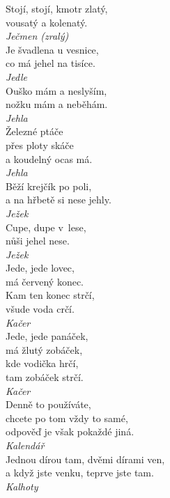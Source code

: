 \begin{multicols}{4}
\noindent
Stojí, stojí, kmotr zlatý,\\
vousatý a kolenatý.\\[1 mm]
{\sl Ječmen (zralý)}\\

\noindent
Je švadlena u vesnice,\\
co má jehel na tisíce.\\[1 mm]
{\sl Jedle}\\

\noindent
Ouško mám a neslyším,\\
nožku mám a neběhám.\\[1 mm]
{\sl Jehla}\\

\noindent
Železné ptáče\\
přes ploty skáče\\
a koudelný ocas má.\\[1 mm]
{\sl Jehla}\\

\noindent
Běží krejčík po poli,\\
a na hřbetě si nese jehly.\\[1 mm]
{\sl Ježek}\\

\noindent
Cupe, dupe v~lese,\\
nůši jehel nese.\\[1 mm]
{\sl Ježek}\\

\noindent
Jede, jede lovec,\\
má červený konec.\\
Kam ten konec strčí,\\
všude voda crčí.\\[1 mm]
{\sl Kačer}\\

\noindent
Jede, jede panáček,\\
má žlutý zobáček,\\
kde vodička hrčí,\\
tam zobáček strčí.\\[1 mm]
{\sl Kačer}\\

\noindent
Denně to používáte,\\
chcete po tom vždy to samé,\\
odpověď je však pokaždé jiná.\\[1 mm]
{\sl Kalendář}\\

\noindent
Jednou dírou tam, dvěmi dírami ven,\\
a když jste venku, teprve jste tam.\\[1 mm]
{\sl Kalhoty}\\


\end{multicols}
